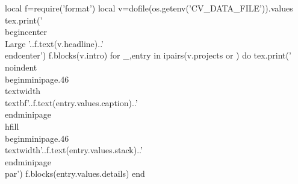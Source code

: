 \documentclass{article}
\begin{document}
\begin{luacode*}
local f=require('format')
local v=dofile(os.getenv('CV_DATA_FILE')).values
tex.print('\\begin{center}\\Large '..f.text(v.headline)..'\\end{center}')
f.blocks(v.intro)
for _,entry in ipairs(v.projects or {}) do
 tex.print('\\noindent\\begin{minipage}{.46\\textwidth}\\textbf{'..f.text(entry.values.caption)..'}\\end{minipage}\\hfill\\begin{minipage}{.46\\textwidth}'..f.text(entry.values.stack)..'\\end{minipage}\\par')
 f.blocks(entry.values.details)
end
\end{luacode*}
\end{document}
